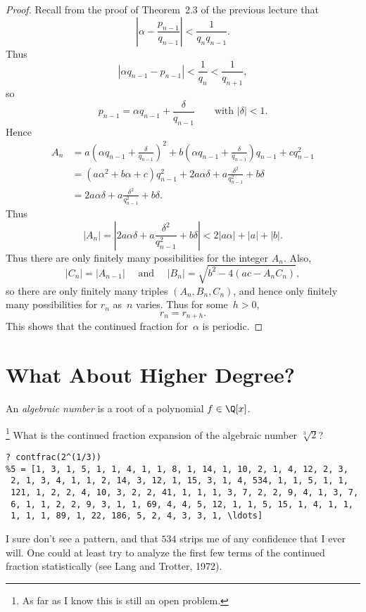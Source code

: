 \documentclass[11pt]{report}
\begin{document}
\begin{proof}
  Recall from the proof of Theorem~2.3 of the previous lecture that
  $$
    \left| \alpha - \frac{p_{n-1}}{q_{n-1}}\right|
    < \frac{1}{q_n q_{n-1}}.
  $$
  Thus
  $$
    \left| \alpha q_{n-1} - p_{n-1}\right| < \frac{1}{q_n} < \frac{1}{q_{n+1}},
  $$
  so
  $$
    p_{n-1} = \alpha q_{n-1} + \frac{\delta}{q_{n-1}}
    \qquad\text{with }|\delta| < 1.
  $$
  Hence
  \begin{align*}
    A_n & = a\left(\alpha q_{n-1} + \frac{\delta}{q_{n-1}}\right)^2
    +b\left(\alpha q_{n-1} + \frac{\delta}{q_{n-1}}\right)q_{n-1}
    +c q_{n-1}^2                                                    \\
        & = (a\alpha^2 + b\alpha + c)q_{n-1}^2 + 2a\alpha\delta +
    a\frac{\delta^2}{q_{n-1}^2} + b\delta                           \\
        & = 2a\alpha\delta + a\frac{\delta^2}{q_{n-1}^2} + b\delta.
  \end{align*}
  Thus
  $$
    |A_n| = \left|2a\alpha\delta + a\frac{\delta^2}{q_{n-1}^2} + b\delta\right|
    < 2|a\alpha| + |a| + |b|.
  $$
  Thus there are only finitely many possibilities for the integer $A_n$.
  Also,
  $$
    |C_n| = |A_{n-1}|
    \quad\text{ and }\quad
    |B_n| = \sqrt{b^2 - 4(ac-A_n C_n)},
  $$
  so there are only finitely many triples $(A_n, B_n, C_n)$,
  and hence only finitely many possibilities for $r_n$ as~$n$
  varies.  Thus for some~$h>0$,
  $$
    r_n = r_{n+h}.
  $$
  This shows that the continued fraction for~$\alpha$ is periodic.
\end{proof}

\section{What About Higher Degree?}
\begin{definition}
  An {\em algebraic number} is a root of a polynomial $f\in\Q[x]$.
\end{definition}

\footnote{As far as I know this is still
  an open problem.}
What is the continued fraction expansion of the algebraic number $\sqrt[3]{2}$?
\begin{verbatim}
? contfrac(2^(1/3))
%5 = [1, 3, 1, 5, 1, 1, 4, 1, 1, 8, 1, 14, 1, 10, 2, 1, 4, 12, 2, 3,
 2, 1, 3, 4, 1, 1, 2, 14, 3, 12, 1, 15, 3, 1, 4, 534, 1, 1, 5, 1, 1, 
 121, 1, 2, 2, 4, 10, 3, 2, 2, 41, 1, 1, 1, 3, 7, 2, 2, 9, 4, 1, 3, 7, 
 6, 1, 1, 2, 2, 9, 3, 1, 1, 69, 4, 4, 5, 12, 1, 1, 5, 15, 1, 4, 1, 1, 
 1, 1, 1, 89, 1, 22, 186, 5, 2, 4, 3, 3, 1, \ldots]
\end{verbatim}
I sure don't see a pattern, and that $534$ strips me of any confidence
that I ever will.  One could at least try to analyze the first few terms
of the continued fraction statistically (see Lang and Trotter, 1972).
\end{document}
